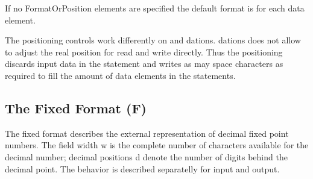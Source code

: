 \begin{modified}
If no FormatOrPosition elements are specified the default format is 
 for each data element.
\end{modified}

The positioning controls work differently on  and 
dations.  dations does not allow to adjust the real position for read
and write directly. 
Thus the positioning discards input data in the  statement and 
writes as may space characters as required to fill the amount of data elements
in the  statements.


\subsection{The Fixed Format (F)}   %
\label{sec_dation_f_format}

\begin{grammarframe}





\end{grammarframe}

The fixed format describes the external representation of decimal fixed
point numbers. The field width w is the complete number of characters
available for the decimal number; decimal positions d denote the number
of digits behind the decimal point. 
The behavior is described separatelly for input and output.

